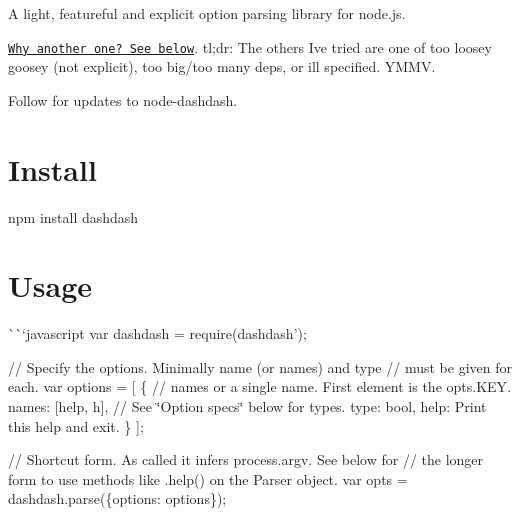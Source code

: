 A light, featureful and explicit option parsing library for node.\+js.

\href{#why}{\tt Why another one? See below}. tl;dr\+: The others I\textquotesingle{}ve tried are one of too loosey goosey (not explicit), too big/too many deps, or ill specified. Y\+M\+MV.

Follow \href{https://twitter.com/intent/user?screen_name=trentmick}{\tt } for updates to node-\/dashdash.

\section*{Install}

\begin{DoxyVerb}npm install dashdash
\end{DoxyVerb}


\section*{Usage}

\`{}\`{}`javascript var dashdash = require(\textquotesingle{}dashdash');

// Specify the options. Minimally {\ttfamily name} (or {\ttfamily names}) and {\ttfamily type} // must be given for each. var options = \mbox{[} \{ // {\ttfamily names} or a single {\ttfamily name}. First element is the {\ttfamily opts.\+K\+EY}. names\+: \mbox{[}\textquotesingle{}help\textquotesingle{}, \textquotesingle{}h\textquotesingle{}\mbox{]}, // See \char`\"{}\+Option specs\char`\"{} below for types. type\+: \textquotesingle{}bool\textquotesingle{}, help\+: \textquotesingle{}Print this help and exit.\textquotesingle{} \} \mbox{]};

// Shortcut form. As called it infers {\ttfamily process.\+argv}. See below for // the longer form to use methods like {\ttfamily .help()} on the Parser object. var opts = dashdash.\+parse(\{options\+: options\});

